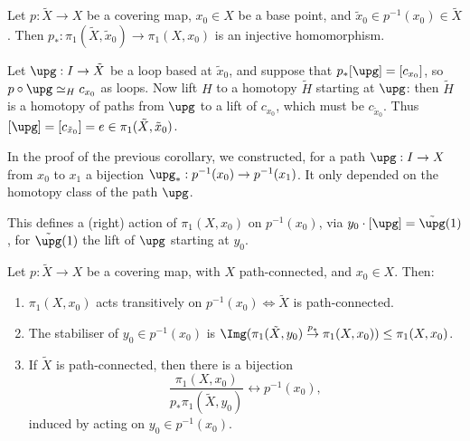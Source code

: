 \documentclass[12pt]{article}
\begin{document}

\begin{lemma}
	Let $p : \tilde X \to X$ be a covering map, $x_0 \in X$ be a base point, and $\tilde x_0 \in p^{-1}(x_0) \in \tilde X$. Then $p_\ast : \pi_1(\tilde X, \tilde x_0) \to \pi_1(X, x_0)$ is an injective homomorphism.
\end{lemma}

\begin{proofbox}
	Let $\upg : I \to \tilde X$ be a loop based at $\tilde x_0$, and suppose that $p_\ast[\upg] = [c_{x_0}]$, so $p \circ \upg \simeq_H c_{x_0}$ as loops. Now lift $H$ to a homotopy $\tilde H$ starting at $\upg$: then $\tilde H$ is a homotopy of paths from $\upg$ to a lift of $c_{x_0}$, which must be $c_{\tilde x_0}$. Thus $[\upg] = [c_{\tilde x_0}] = e \in \pi_1(\tilde X, \tilde x_0)$.
\end{proofbox}

In the proof of the previous corollary, we constructed, for a path $\upg : I \to X$ from $x_0$ to $x_1$ a bijection $\upg_\ast : p^{-1}(x_0)\to p^{-1}(x_1)$. It only depended on the homotopy class of the path $\upg$.

This defines a (right) action of $\pi_1(X, x_0)$ on $p^{-1}(x_0)$, via $y_0 \cdot [\upg] = \tilde \upg(1)$, for $\tilde \upg(1)$ the lift of $\upg$ starting at $y_0$.

\begin{lemma}
	Let $p : \tilde X \to X$ be a covering map, with $X$ path-connected, and $x_0 \in X$. Then:
	\begin{enumerate}[\normalfont(i)]
		\item $\pi_1(X, x_0)$ acts transitively on $p^{-1}(x_0) \iff \tilde X$ is path-connected.
		\item The stabiliser of $y_0 \in p^{-1}(x_0)$ is $\Img(\pi_1(\tilde X , y_0) \overset{p_\ast}{\to} \pi_1(X, x_0)) \leq \pi_1(X, x_0)$.
		\item If $\tilde X$ is path-connected, then there is a bijection
			\[
			\frac{\pi_1(X, x_0)}{p_\ast \pi_1(\tilde X, y_0)} \leftrightarrow p^{-1}(x_0),
			\]
			induced by acting on $y_0 \in p^{-1}(x_0)$.
	\end{enumerate}
\end{lemma}
\end{document}
